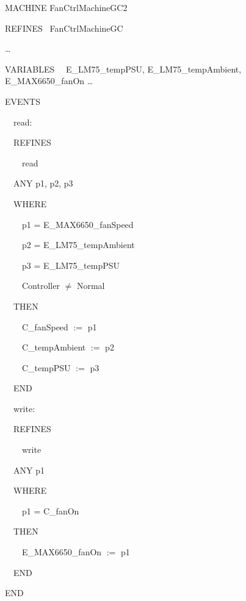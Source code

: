 \documentclass[a4paper]{article}
\title{}
\author{Andy }
\date{2013-08-06}
\begin{document}
MACHINE FanCtrlMachineGC2 \ \ 

REFINES \ FanCtrlMachineGC 

{\dots} 

VARIABLES \ \ E\_LM75\_tempPSU, E\_LM75\_tempAmbient, E\_MAX6650\_fanOn
{\dots} 

EVENTS

\ \ read:\ \  

\ \ REFINES

\ \ \ \  read 

\ \ ANY p1, p2, p3\ \  \ \ 

\ \ WHERE

\ \ \ \ p1 = E\_MAX6650\_fanSpeed \ \ 

\ \ \ \ p2 = E\_LM75\_tempAmbient \ \ 

\ \ \ \ p3 = E\_LM75\_tempPSU \ \ 

\ \ \ \ Controller ${\neq}$ Normal \ \ 

\ \ THEN

\ \ \ \ C\_fanSpeed $:=$ p1 

\ \ \ \ C\_tempAmbient $:=$ p2 \ 

\ \ \ \ C\_tempPSU $:=$ p3 

\ \ END


\bigskip

\ \ write:\ \ 

\ \ REFINES

\ \ \ \  write 

\ \ ANY p1\ \  \ 

\ \ WHERE

\ \ \ \ p1 = C\_fanOn \ \ 

\ \ THEN

\ \ \ \ E\_MAX6650\_fanOn $:=$ p1 

\ \ END

END
\end{document}
